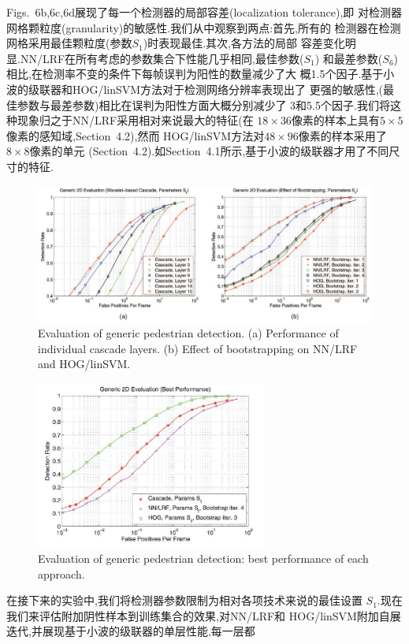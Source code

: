\documentclass[10pt,letterpaper,journal,compsoc]{IEEEtran}
\begin{document}
Figs.~6b,6c,6d展现了每一个检测器的局部容差(localization tolerance),即
对检测器网格颗粒度(granularity)的敏感性.我们从中观察到两点:首先,所有的
检测器在检测网格采用最佳颗粒度(参数$S_1$)时表现最佳.其次,各方法的局部
容差变化明显.NN/LRF在所有考虑的参数集合下性能几乎相同,最佳参数($S_1$)
和最差参数($S_6$)相比,在检测率不变的条件下每帧误判为阳性的数量减少了大
概1.5个因子.基于小波的级联器和HOG/linSVM方法对于检测网络分辨率表现出了
更强的敏感性,(最佳参数与最差参数)相比在误判为阳性方面大概分别减少了
3和5.5个因子.我们将这种现象归之于NN/LRF采用相对来说最大的特征(在
$18\times36$像素的样本上具有$5\times5$像素的感知域,Section~4.2),然而
HOG/linSVM方法对$48\times96$像素的样本采用了$8\times8$像素的单元
(Section~4.2).如Section~4.1所示,基于小波的级联器才用了不同尺寸的特征.

\begin{figure}[!t]
\centering
\includegraphics[width=7in]{fig7.JPG}
\caption{Evaluation of generic pedestrian detection. (a) Performance of individual cascade layers. (b) Effect of bootstrapping on NN/LRF and
HOG/linSVM.}
\end{figure}
\begin{figure}[!b]
\centering
\includegraphics[width=3in]{fig8.JPG}
\caption{Evaluation of generic pedestrian detection: best performance of
each approach.}
\end{figure}
在接下来的实验中,我们将检测器参数限制为相对各项技术来说的最佳设置
$S_1$.现在我们来评估附加阴性样本到训练集合的效果,对NN/LRF和
HOG/linSVM附加自展迭代,并展现基于小波的级联器的单层性能,每一层都
\end{document}

